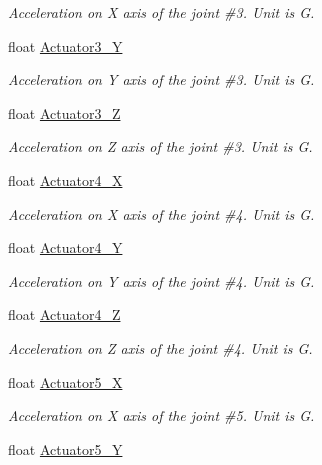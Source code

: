 \begin{DoxyCompactItemize}
\begin{DoxyCompactList}\small\item\em Acceleration on X axis of the joint \#3. Unit is G. \end{DoxyCompactList}\item 
float \hyperlink{struct_angular_acceleration_a8b372df5c994266783918e9fc7260cb3}{Actuator3\+\_\+Y}
\begin{DoxyCompactList}\small\item\em Acceleration on Y axis of the joint \#3. Unit is G. \end{DoxyCompactList}\item 
float \hyperlink{struct_angular_acceleration_a178c35c220a0d0ecc8e0d228c10dfac0}{Actuator3\+\_\+Z}
\begin{DoxyCompactList}\small\item\em Acceleration on Z axis of the joint \#3. Unit is G. \end{DoxyCompactList}\item 
float \hyperlink{struct_angular_acceleration_a5ac59b5d6354f56a574849b3058aff8a}{Actuator4\+\_\+X}
\begin{DoxyCompactList}\small\item\em Acceleration on X axis of the joint \#4. Unit is G. \end{DoxyCompactList}\item 
float \hyperlink{struct_angular_acceleration_ab19b628ee0ba917a65b5f0ccb4c663c0}{Actuator4\+\_\+Y}
\begin{DoxyCompactList}\small\item\em Acceleration on Y axis of the joint \#4. Unit is G. \end{DoxyCompactList}\item 
float \hyperlink{struct_angular_acceleration_a4407b12848019a178128df8cd3f7a371}{Actuator4\+\_\+Z}
\begin{DoxyCompactList}\small\item\em Acceleration on Z axis of the joint \#4. Unit is G. \end{DoxyCompactList}\item 
float \hyperlink{struct_angular_acceleration_a7ae66f2e31c5e90fe07b234e474ead12}{Actuator5\+\_\+X}
\begin{DoxyCompactList}\small\item\em Acceleration on X axis of the joint \#5. Unit is G. \end{DoxyCompactList}\item 
float \hyperlink{struct_angular_acceleration_a44a285d25040047b089f3d977a82546a}{Actuator5\+\_\+Y}

\end{DoxyCompactItemize}

